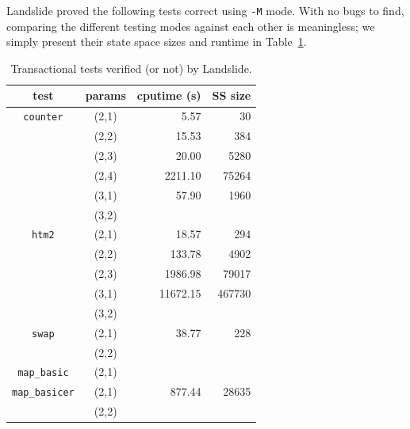 \documentclass[10pt]{sigplanconf}
\begin{document}
Landslide proved the following tests correct using {\tt -M} mode.
With no bugs to find, comparing the different testing modes against each other is meaningless;
we simply present their state space sizes and runtime in Table~\ref{tab:verifs}.

\newcommand\ETAdag[1]{\ETA{\ensuremath{\dagger}#1}\xspace}
\begin{table}[h]
	\begin{center}
		\begin{tabular}{cc|r|r}
			test & params & cputime (s) & SS size \\
			\hline
			\hline
			{\tt counter}
			& (2,1) & 5.57	& 30	\\
			& (2,2) & 15.53	& 384	\\
			& (2,3) & 20.00	& 5280	\\
			& (2,4) &2211.10& 75264	\\
			& (3,1) & 57.90	& 1960	\\
			& (3,2) &	&	\\
			\hline
			{\tt htm2}
			& (2,1) & 18.57	& 294	\\
			& (2,2) & 133.78& 4902	\\
			& (2,3) &1986.98& 79017	\\
			& (3,1) &11672.15& 467730	\\
			& (3,2) &	&	\\
			\hline
			{\tt swap}
			& (2,1) & 38.77	& 228	\\
			& (2,2) &	&	\\
			\hline
			{\tt map\_basic}
			& (2,1) & \ETAdag{10d 16h} & \ETAdag{16388977} \\
			\hline
			{\tt map\_basicer}
			& (2,1) & 877.44& 28635	\\
			& (2,2) &	&	\\ %
		\end{tabular}
	\end{center}
	\caption{Transactional tests verified (or not) by Landslide.}
	\label{tab:verifs}
\end{table}
\end{document}
